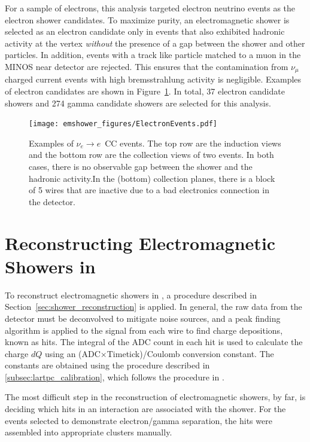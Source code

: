 For a sample of electrons, this analysis targeted electron neutrino events as the electron shower candidates.  To maximize purity, an electromagnetic shower is selected as an electron candidate only in events that also exhibited hadronic activity at the vertex {\em without} the presence of a gap between the shower and other particles.  In addition, events with a track like particle matched to a muon in the MINOS near detector are rejected.  This ensures that the contamination from $\nu_\mu$ charged current events with high bremsstrahlung activity is negligible.  Examples of electron candidates are shown in Figure~\ref{fig:electrons}. In total, 37 electron candidate showers and 274 gamma candidate showers are selected for this analysis.



\begin{figure}[ht]
\centering
\texttt{[image: emshower\_figures/ElectronEvents.pdf]}
\caption[Electron Candidate Events in \argoneut]{\label{fig:electrons} Examples of $\nu_e \rightarrow e$~CC events.  The top row are the induction views and the bottom row are the collection views of two events. In both cases, there is no observable gap between the shower and the hadronic activity.In the (bottom) collection planes, there is a block of 5 wires that are inactive due to a bad electronics connection in the detector.}
\end{figure}


\section{Reconstructing Electromagnetic Showers in \lartpcs}

To reconstruct electromagnetic showers in \lartpcs, a procedure described in Section~\ref{sec:shower_reconstruction} is applied.  In general, the raw data from the detector must be deconvolved to mitigate noise sources, and a peak finding algorithm is applied to the signal from each wire to find charge depositions, known as hits. The integral of the ADC count in each hit is used to calculate the charge $dQ$ using an (ADC$\times$Timetick)/Coulomb conversion constant.  The constants are obtained using the procedure described in \ref{subsec:lartpc_calibration}, which follows the procedure in \cite{Anderson:2012mra}.

The most difficult step in the reconstruction of electromagnetic showers, by far, is deciding which hits in an interaction are associated with the shower. For the events selected to demonstrate electron/gamma separation, the hits were assembled into appropriate clusters manually.

